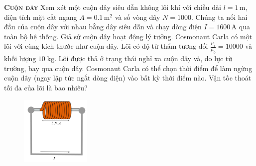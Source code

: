 \begin{problem}{\textbf{\textsc{Cuộn dây}}}
Xem xét một cuộn dây siêu dẫn không lõi khí với chiều dài \( l = 1 \, \text{m} \), diện tích mặt cắt ngang \( A = 0.1 \, \text{m}^2 \) và số vòng dây \( N = 1000 \). Chúng ta nối hai đầu của cuộn dây với nhau bằng dây siêu dẫn và chạy dòng điện \( I = 1600 \, \text{A} \) qua toàn bộ hệ thống. Giả sử cuộn dây hoạt động lý tưởng.
\newline
\newline
Cosmonaut Carla có một lõi với cùng kích thước như cuộn dây. Lõi có độ từ thẩm tương đối $\frac{\mu_i}{\mu_0} = 10000$ và khối lượng $10\;\mathrm{kg}$. Lõi được thả ở trạng thái nghỉ xa cuộn dây và, do lực từ trường, bay qua cuộn dây. Cosmonaut Carla có thể chọn thời điểm để làm ngừng cuộn dây (ngay lập tức ngắt dòng điện) vào bất kỳ thời điểm nào. Vận tốc thoát tối đa của lõi là bao nhiêu?   


\FloatBarrier
\begin{figure}[!htbp]
\centering
\includegraphics[width=0.3\textwidth]{problems/figures/coilfun.png}
\end{figure}
\FloatBarrier

\end{problem}
